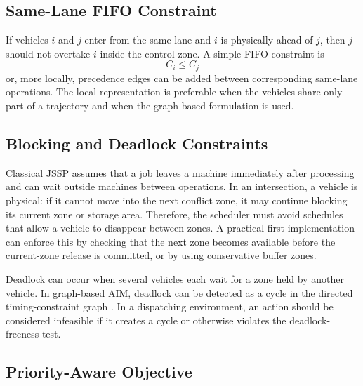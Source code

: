 \subsection{Same-Lane FIFO Constraint}

If vehicles $i$ and $j$ enter from the same lane and $i$ is physically ahead of $j$, then $j$ should not overtake $i$ inside the control zone. A simple FIFO constraint is
\begin{equation}
    C_i \le C_j
\end{equation}
or, more locally, precedence edges can be added between corresponding same-lane operations. The local representation is preferable when the vehicles share only part of a trajectory and when the graph-based formulation is used.

\subsection{Blocking and Deadlock Constraints}

Classical JSSP assumes that a job leaves a machine immediately after processing and can wait outside machines between operations. In an intersection, a vehicle is physical: if it cannot move into the next conflict zone, it may continue blocking its current zone or storage area. Therefore, the scheduler must avoid schedules that allow a vehicle to disappear between zones. A practical first implementation can enforce this by checking that the next zone becomes available before the current-zone release is committed, or by using conservative buffer zones.

Deadlock can occur when several vehicles each wait for a zone held by another vehicle. In graph-based AIM, deadlock can be detected as a cycle in the directed timing-constraint graph \cite{lin2019graph}. In a dispatching environment, an action should be considered infeasible if it creates a cycle or otherwise violates the deadlock-freeness test.

\subsection{Priority-Aware Objective}

